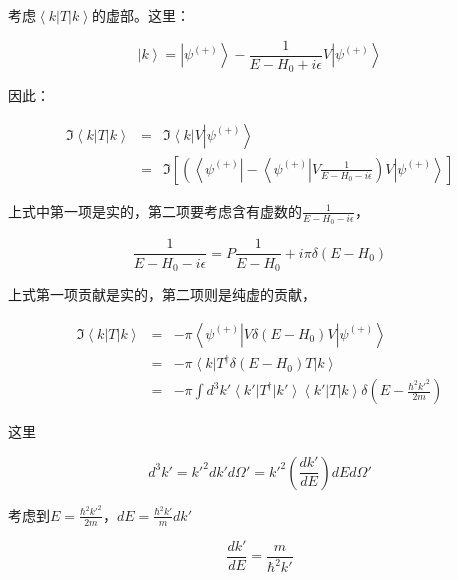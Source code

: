 考虑$\left\langle k \right| T \left| k \right\rangle$的虚部。这里：

\begin{equation}
\left| k \right\rangle = \left| \psi^{(+)} \right\rangle - \frac{1}{E - H_0 + i \epsilon} V \left| \psi^{(+)} \right\rangle
\end{equation}

因此：

\begin{eqnarray*}
\Im \left\langle k \right| T \left| k \right\rangle & = & \Im \left\langle k \right| V \left| \psi^{(+)} \right\rangle \\
{} & = & \Im \left[  \left(  \left\langle \psi^{(+)} \right| -  \left\langle \psi^{(+)} \right| V \frac{1}{E - H_0 - i \epsilon} \right) V \left| \psi^{(+)} \right\rangle     \right]
\end{eqnarray*}

上式中第一项是实的，第二项要考虑含有虚数的$\frac{1}{E - H_0 - i \epsilon}$，

\begin{equation}
\frac{1}{E - H_0 - i \epsilon} = P \frac{1}{E- H_0} + i \pi \delta(E - H_0)
\end{equation}

上式第一项贡献是实的，第二项则是纯虚的贡献，

\begin{eqnarray*}
\Im \left\langle k \right| T \left| k \right\rangle & = & - \pi \left\langle \psi^{(+)} \right| V \delta (E - H_0) V \left| \psi^{(+)} \right\rangle \\
{} & = & - \pi \left\langle k \right| T^\dagger \delta (E - H_0) T \left| k \right\rangle \\
{} & = & - \pi \int d^3 k' \left\langle k' \right| T^\dagger \left| k' \right\rangle \left\langle k' \right| T \left| k \right\rangle \delta(E - \frac{\hbar^2 k'^2}{2m})
\end{eqnarray*}

这里

\begin{equation}
d^3 k' = k'^2 dk' d \Omega' = k'^2  \left( \frac{dk'}{dE} \right) dE d \Omega'
\end{equation}

考虑到$E = \frac{\hbar^2 k'^2}{2m}$，$dE = \frac{\hbar^2 k'}{m} dk'$

\begin{equation}
\frac{d k'}{d E } = \frac{m }{\hbar^2 k'}
\end{equation}

